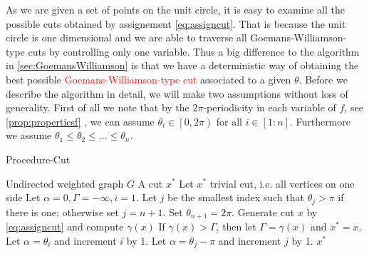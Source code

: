 \documentclass[12pt,a4paper]{article}
\theoremstyle{mythm}
\begin{document}
As we are given a set of points on the unit circle, it is easy to examine all the possible cuts obtained by assignement \ref{eq:assigncut}. 
That is because the unit circle is one dimensional and we are able to traverse all Goemans-Williamson-type cuts by controlling only one variable.
Thus a big difference to the algorithm in \ref{sec:GoemansWilliamson} is that we have a deterministic way of obtaining the best possible \textcolor{red}{Goemans-Williamson-type
cut} associated to a given $ \theta $.
Before we describe the algorithm in detail, we will make two assumptions without loss of generality.
First of all we note that by the $ 2\pi $-periodicity in each variable of $ f $, see \ref{prop:propertiesf} , we can assume $ \theta_i \in \left[ 0,2\pi \right)  $ for all $ i
\in \left[ 1:n \right]  $.
Furthermore we assume $ \theta_1 \leq \theta_2 \leq \dots \leq \theta_n  $.
\begin{algorithm}
\caption{Procedure-Cut}
\label{alg:ProcedureCUT} 
\begin{algorithmic}[1]
\Require Undirected weighted graph $ G $
\Ensure A cut $ x^* $
\State Let $ x^* $ trivial cut, i.e. all vertices on one side
\State Let $ \alpha =0, \Gamma = -\infty , i =1 $. Let $ j $ be the smallest index such that $ \theta_j > \pi $ if there is one; otherwise set $ j = n+1 $. Set $ \theta _{ n+1
} = 2\pi $.
\While{ $ \alpha < \pi $}
\State Generate cut $ x $ by \ref{eq:assigncut} and compute $ \gamma (x) $
\label{gencut} 
\State If $ \gamma (x) > \Gamma $, then let $ \Gamma = \gamma (x) $ and $ x^* = x $.
  \State Let $ \alpha = \theta_i $ and increment $ i $ by 1.
\Else 
\State Let $ \alpha = \theta_j - \pi $ and increment $ j $ by 1.
\EndIf
\EndWhile
\State \Return $ x ^{ * }  $
\end{algorithmic}
\end{algorithm}
\end{document}

